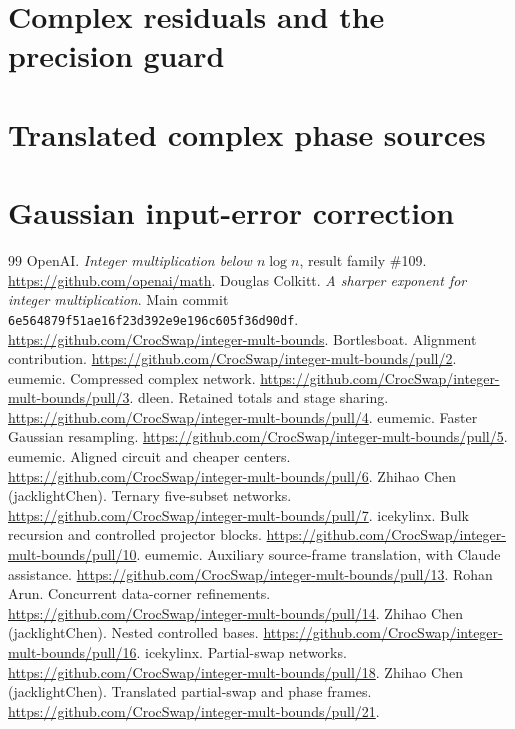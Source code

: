 \documentclass[11pt]{article}
\begin{document}
\section{Complex residuals and the precision guard}

\section{Translated complex phase sources}


\section{Gaussian input-error correction}


\begin{thebibliography}{99}
 OpenAI. \emph{Integer multiplication below $n\log n$},
result family \#109. \url{https://github.com/openai/math}.
 Douglas Colkitt. \emph{A sharper exponent for integer
multiplication}. Main commit
\texttt{6e564879f51ae16f23d392e9e196c605f36d90df}.
\url{https://github.com/CrocSwap/integer-mult-bounds}.
 Bortlesboat. Alignment contribution.
\url{https://github.com/CrocSwap/integer-mult-bounds/pull/2}.
 eumemic. Compressed complex network.
\url{https://github.com/CrocSwap/integer-mult-bounds/pull/3}.
 dleen. Retained totals and stage sharing.
\url{https://github.com/CrocSwap/integer-mult-bounds/pull/4}.
 eumemic. Faster Gaussian resampling.
\url{https://github.com/CrocSwap/integer-mult-bounds/pull/5}.
 eumemic. Aligned circuit and cheaper centers.
\url{https://github.com/CrocSwap/integer-mult-bounds/pull/6}.
 Zhihao Chen (jacklightChen). Ternary five-subset networks.
\url{https://github.com/CrocSwap/integer-mult-bounds/pull/7}.
 icekylinx. Bulk recursion and controlled projector blocks.
\url{https://github.com/CrocSwap/integer-mult-bounds/pull/10}.
 eumemic. Auxiliary source-frame translation, with Claude assistance.
\url{https://github.com/CrocSwap/integer-mult-bounds/pull/13}.
 Rohan Arun. Concurrent data-corner refinements.
\url{https://github.com/CrocSwap/integer-mult-bounds/pull/14}.
 Zhihao Chen (jacklightChen). Nested controlled bases.
\url{https://github.com/CrocSwap/integer-mult-bounds/pull/16}.
 icekylinx. Partial-swap networks.
\url{https://github.com/CrocSwap/integer-mult-bounds/pull/18}.
 Zhihao Chen (jacklightChen). Translated partial-swap and phase frames.
\url{https://github.com/CrocSwap/integer-mult-bounds/pull/21}.
\end{thebibliography}
\end{document}
